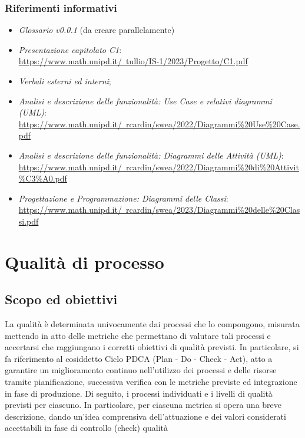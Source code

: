 \documentclass[10pt, a4paper]{article}
\begin{document}
    \subsubsection{Riferimenti informativi}
    
    \begin{itemize}
    \item \textit{Glossario v0.0.1} (da creare parallelamente) 
    \item \textit{Presentazione capitolato C1}:\\
    \href{https://www.math.unipd.it/~tullio/IS-1/2023/Progetto/C1.pdf}{https://www.math.unipd.it/~tullio/IS-1/2023/Progetto/C1.pdf}
    \item \textit{Verbali esterni ed interni};
    \item \textit{Analisi e descrizione delle funzionalità: Use Case e relativi diagrammi (UML)}:\\
    \href{https://www.math.unipd.it/~rcardin/swea/2022/Diagrammi%20Use%20Case.pdf}{https://www.math.unipd.it/~rcardin/swea/2022/Diagrammi\%20Use\%20Case.pdf}
    \item \textit{Analisi e descrizione delle funzionalità: Diagrammi delle Attività (UML)}:\\
    \href{https://www.math.unipd.it/~rcardin/swea/2022/Diagrammi%20di%20Attivit%C3%A0.pdf}{https://www.math.unipd.it/~rcardin/swea/2022/Diagrammi\%20di\%20Attivit\%C3\%A0.pdf}
    \item \textit{Progettazione e Programmazione: Diagrammi delle Classi}:\\
    \href{https://www.math.unipd.it/~rcardin/swea/2023/Diagrammi%20delle%20Classi.pdf}{https://www.math.unipd.it/~rcardin/swea/2023/Diagrammi\%20delle\%20Classi.pdf}
    \end{itemize}

\newpage
\section{Qualità di processo}
\subsection{Scopo ed obiettivi}
La qualità è determinata univocamente dai processi che lo compongono, misurata mettendo in atto 
delle metriche che permettano di valutare tali processi e accertarsi che raggiungano i corretti 
obiettivi di qualità previsti. In particolare, si fa riferimento al cosiddetto Ciclo PDCA (Plan - Do - Check 
- Act), atto a garantire un miglioramento continuo nell’utilizzo dei processi e delle risorse tramite 
pianificazione, successiva verifica con le metriche previste ed integrazione in fase di produzione. Di 
seguito, i processi individuati e i livelli di qualità previsti per ciascuno.
In particolare, per ciascuna metrica si opera una breve descrizione, dando un’idea comprensiva 
dell’attuazione e dei valori considerati accettabili in fase di controllo (check) qualità
\end{document}
